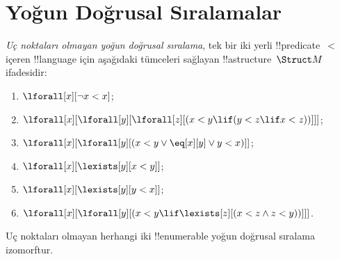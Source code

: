 

\section{Yoğun Doğrusal Sıralamalar}

\begin{defn}
  \emph{Uç noktaları olmayan yoğun doğrusal sıralama}, tek bir iki yerli
  !!{predicate}~$<$ içeren !!{language} için aşağıdaki tümceleri
  sağlayan !!a{structure}~$\Struct M$ ifadesidir:
  \begin{enumerate}
  \item $\lforall[x][\lnot x < x]$;
  \item $\lforall[x][\lforall[y][\lforall[z][(x < y \lif (y < z \lif x
    <z ))]]]$;
  \item $\lforall[x][\lforall[y][(x< y \lor \eq[x][y] \lor y < x)]]$;
  \item $\lforall[x][\lexists[y][x < y]]$;
  \item $\lforall[x][\lexists[y][y < x]]$;
  \item $\lforall[x][\lforall[y][(x < y \lif \lexists[z][(x < z \land
        z < y))]]]$.
 \end{enumerate}
\end{defn}

\begin{thm}
  Uç noktaları olmayan herhangi iki !!{enumerable} yoğun doğrusal
  sıralama izomorftur.
\end{thm}

